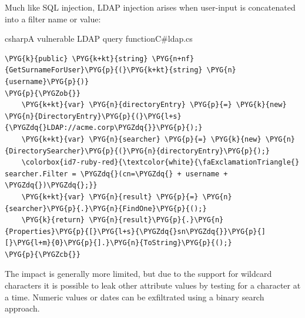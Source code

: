 \documentclass[a4paper,openany,12pt]{book}
\begin{document}
Much like SQL injection, LDAP injection arises when user-input is concatenated into a filter name or value:

\newsavebox\myva
\begin{lrbox}{\myva}\begin{minipage}{\textwidth}
    \begin{mycodefile}{csharp}{\label{code:motivating:ldap:1}A vulnerable LDAP query function}{C\#}{ldap.cs}\end{mycodefile}
\end{minipage}\end{lrbox}


\begin{mdframed}[backgroundcolor=lightgrey]
\begin{Verbatim}[commandchars=\\\{\}]
\PYG{k}{public} \PYG{k+kt}{string} \PYG{n+nf}{GetSurnameForUser}\PYG{p}{(}\PYG{k+kt}{string} \PYG{n}{username}\PYG{p}{)}
\PYG{p}{\PYGZob{}}
    \PYG{k+kt}{var} \PYG{n}{directoryEntry} \PYG{p}{=} \PYG{k}{new} \PYG{n}{DirectoryEntry}\PYG{p}{(}\PYG{l+s}{\PYGZdq{}LDAP://acme.corp\PYGZdq{}}\PYG{p}{);}
    \PYG{k+kt}{var} \PYG{n}{searcher} \PYG{p}{=} \PYG{k}{new} \PYG{n}{DirectorySearcher}\PYG{p}{(}\PYG{n}{directoryEntry}\PYG{p}{);}
    \colorbox{id7-ruby-red}{\textcolor{white}{\faExclamationTriangle{} searcher.Filter = \PYGZdq{}(cn=\PYGZdq{} + username + \PYGZdq{})\PYGZdq{};}}
    \PYG{k+kt}{var} \PYG{n}{result} \PYG{p}{=} \PYG{n}{searcher}\PYG{p}{.}\PYG{n}{FindOne}\PYG{p}{();}
    \PYG{k}{return} \PYG{n}{result}\PYG{p}{.}\PYG{n}{Properties}\PYG{p}{[}\PYG{l+s}{\PYGZdq{}sn\PYGZdq{}}\PYG{p}{][}\PYG{l+m}{0}\PYG{p}{].}\PYG{n}{ToString}\PYG{p}{();}
\PYG{p}{\PYGZcb{}}
\end{Verbatim}
\end{mdframed}

The impact is generally more limited, but due to the support for wildcard characters it is possible to leak other
attribute values by testing for a character at a time.
Numeric values or dates can be exfiltrated using a binary search approach.
\end{document}
